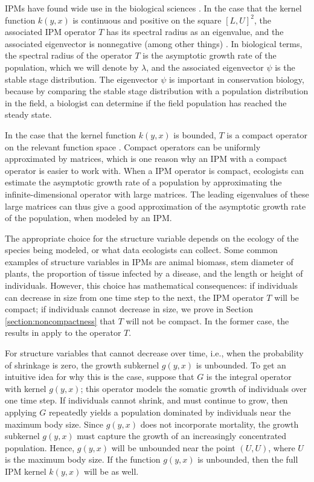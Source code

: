 IPMs have found wide use in the biological sciences \cite{Ellner2016}. In the case that the kernel function $k(y,x)$ is continuous and positive on the square $[L, U]^2$, the associated IPM operator $T$ has its spectral radius as an eigenvalue, and the associated eigenvector is nonnegative (among other things) \cite{Ellner2006}. In biological terms, the spectral radius of the operator $T$ is the asymptotic growth rate of the population, which we will denote by $\lambda$, and the associated eigenvector $\psi$ is the stable stage distribution. The eigenvector $\psi$ is important in conservation biology, because by comparing the stable stage distribution with a population distribution in the field, a biologist can determine if the field population has reached the steady state. 

In the case that the kernel function $k(y, x)$ is bounded, $T$ is a compact operator on the relevant function space \cite{Ellner2006}. Compact operators can be uniformly approximated by matrices, which is one reason why an IPM with a compact operator is easier to work with. When a IPM operator is compact, ecologists can estimate the asymptotic growth rate of a population by approximating the infinite-dimensional operator with large matrices. The leading eigenvalues of these large matrices can thus give a good approximation of the asymptotic growth rate of the population, when modeled by an IPM.

The appropriate choice for the structure variable depends on the ecology of the species being modeled, or what data ecologists can collect. Some common examples of structure variables in IPMs are animal biomass, stem diameter of plants, the proportion of tissue infected by a disease, and the length or height of individuals. However, this choice has mathematical consequences: if individuals can decrease in size from one time step to the next, the IPM operator $T$ will be compact; if individuals cannot decrease in size, we prove in Section \ref{section:noncompactness} that $T$ will not be compact. In the former case, the results in \cite{Ellner2006} apply to the operator $T$.

For structure variables that cannot decrease over time, i.e., when the probability of shrinkage is zero, the growth subkernel $g(y, x)$ is unbounded. To get an intuitive idea for why this is the case, suppose that $G$ is the integral operator with kernel $g(y, x)$; this operator models the somatic growth of individuals over one time step. If individuals cannot shrink, and must continue to grow, then applying $G$ repeatedly yields a population dominated by individuals near the maximum body size. Since $g(y, x)$ does not incorporate mortality, the growth subkernel $g(y, x)$ must capture the growth of an increasingly concentrated population. Hence, $g(y, x)$ will be unbounded near the point $(U, U)$, where $U$ is the maximum body size. If the function $g(y, x)$ is unbounded, then the full IPM kernel $k(y, x)$ will be as well. 

